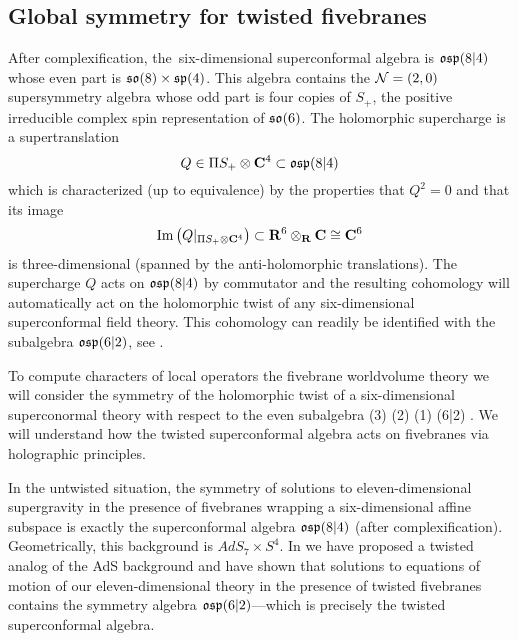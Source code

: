 \subsection{Global symmetry for twisted fivebranes}

% 

After complexification, the~six-dimensional superconformal algebra is $\mathfrak{osp}(8|4)$ whose even part is $\mathfrak{so}(8) \times \mathfrak{sp}(4)$. 
This algebra contains the $\mathcal N=(2,0)$ supersymmetry algebra whose odd part is four copies of $S_+$, the positive irreducible complex spin representation of $\mathfrak{so}(6)$.
The holomorphic supercharge is a supertranslation 
\[
Q \in \Pi S_+ \otimes \mathbf{C}^4 \subset \mathfrak{osp}(8|4)
\]
which is characterized (up to equivalence) by the properties that $Q^2 = 0$ and that its image
\[
{\rm Im}\left(Q|_{\Pi S_+ \otimes \mathbf{C}^4} \right) \subset \mathbf{R}^6 \otimes_{\mathbf{R}} \mathbf{C} \cong \mathbf{C}^6
\]
is three-dimensional (spanned by the anti-holomorphic translations). 
The supercharge $Q$ acts on $\mathfrak{osp}(8|4)$ by commutator and the resulting cohomology will automatically act on the holomorphic twist of any six-dimensional superconformal field theory. 
This cohomology can readily be identified with the subalgebra $\mathfrak{osp}(6|2)$, see \cite{SWe36}. 

To compute characters of local operators the fivebrane worldvolume theory we will consider the symmetry of the holomorphic twist of a six-dimensional superconormal theory with respect to the even subalgebra 
\beqn\label{eqn:bosonic1}
(3) \times {}(2) \times {}(1) \subset {}(6|2) .
\eeqn
We will understand how the twisted superconformal algebra acts on fivebranes via holographic principles.

In the untwisted situation, the symmetry of solutions to eleven-dimensional supergravity in the presence of fivebranes wrapping a six-dimensional affine subspace is exactly the superconformal algebra $\mathfrak{osp}(8|4)$ (after complexification). 
Geometrically, this background is $AdS_7 \times S^4$. 
In \cite{RSW} we have proposed a twisted analog of the AdS background and have shown that solutions to equations of motion of our eleven-dimensional theory in the presence of twisted fivebranes contains the symmetry algebra $\mathfrak{osp}(6|2)$---which is precisely the twisted superconformal algebra.

